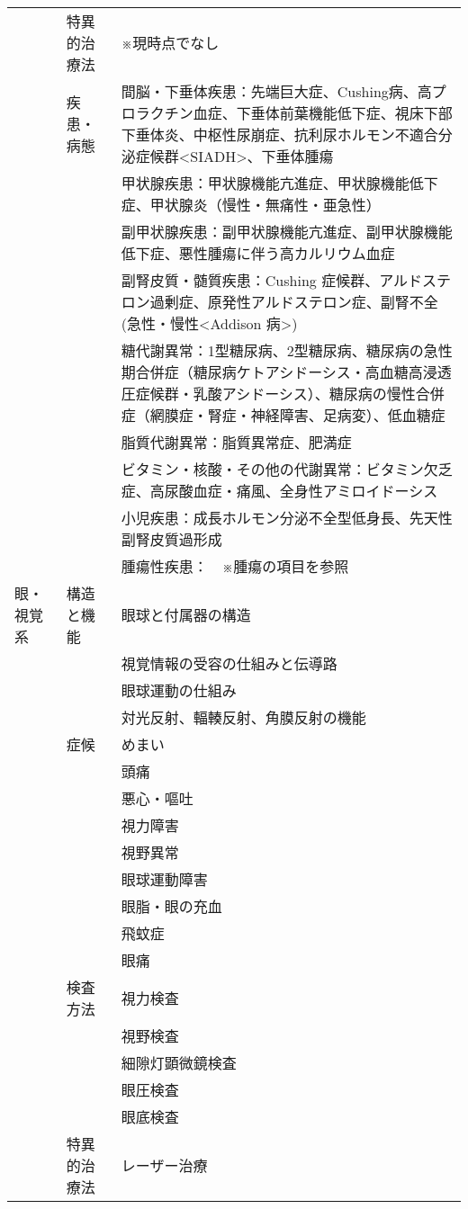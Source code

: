\documentclass[
]{ltjsarticle}
\begin{document}
\begin{xltabular}{\linewidth}{XXX}
 & 特異的治療法 & ※現時点でなし \\
 & 疾患・病態 & 間脳・下垂体疾患：先端巨大症、Cushing病、高プロラクチン血症、下垂体前葉機能低下症、視床下部下垂体炎、中枢性尿崩症、抗利尿ホルモン不適合分泌症候群<SIADH>、下垂体腫瘍 \\
 &  & 甲状腺疾患：甲状腺機能亢進症、甲状腺機能低下症、甲状腺炎（慢性・無痛性・亜急性） \\
 &  & 副甲状腺疾患：副甲状腺機能亢進症、副甲状腺機能低下症、悪性腫瘍に伴う高カルリウム血症 \\
 &  & 副腎皮質・髄質疾患：Cushing 症候群、アルドステロン過剰症、原発性アルドステロン症、副腎不全(急性・慢性<Addison 病>) \\
 &  & 糖代謝異常：1型糖尿病、2型糖尿病、糖尿病の急性期合併症（糖尿病ケトアシドーシス・高血糖高浸透圧症候群・乳酸アシドーシス）、糖尿病の慢性合併症（網膜症・腎症・神経障害、足病変）、低血糖症 \\
 &  & 脂質代謝異常：脂質異常症、肥満症 \\
 &  & ビタミン・核酸・その他の代謝異常：ビタミン欠乏症、高尿酸血症・痛風、全身性アミロイドーシス \\
 &  & 小児疾患：成長ホルモン分泌不全型低身長、先天性副腎皮質過形成 \\
 &  & 腫瘍性疾患：　※腫瘍の項目を参照 \\
眼・視覚系 & 構造と機能 & 眼球と付属器の構造 \\
 &  & 視覚情報の受容の仕組みと伝導路 \\
 &  & 眼球運動の仕組み \\
 &  & 対光反射、輻輳反射、角膜反射の機能 \\
 & 症候 & めまい \\
 &  & 頭痛 \\
 &  & 悪心・嘔吐 \\
 &  & 視力障害 \\
 &  & 視野異常 \\
 &  & 眼球運動障害 \\
 &  & 眼脂・眼の充血 \\
 &  & 飛蚊症 \\
 &  & 眼痛 \\
 & 検査方法 & 視力検査 \\
 &  & 視野検査 \\
 &  & 細隙灯顕微鏡検査 \\
 &  & 眼圧検査 \\
 &  & 眼底検査 \\
 & 特異的治療法 & レーザー治療 \\

\end{xltabular}
\end{document}
